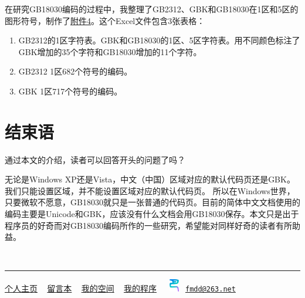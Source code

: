 \documentclass[cn,hazy,blue,14pt,screen]{elegantnote}
\begin{document}
在研究GB18030编码的过程中，我整理了GB2312、GBK和GB18030在1区和5区的图形符号，制作了\href{samples/sym.zip}{附件4}。这个Excel文件包含3张表格：

\begin{enumerate}

\item
  GB2312的1区字符表。GBK和GB18030的1区、5区字符表。用不同颜色标注了GBK增加的35个字符和GB18030增加的11个字符。
\item
  GB2312 1区682个符号的编码。
\item
  GBK 1区717个符号的编码。
\end{enumerate}

\hypertarget{ux7ed3ux675fux8bed}{%
\section{结束语}\label{ux7ed3ux675fux8bed}}

通过本文的介绍，读者可以回答开头的问题了吗？

无论是Windows
XP还是Vista，中文（中国）区域对应的默认代码页还是GBK。我们只能设置区域，并不能设置区域对应的默认代码页。
所以在Windows世界，只要微软不愿意，GB18030就只是一张普通的代码页。目前的简体中文文档使用的编码主要是Unicode和GBK，应该没有什么文档会用GB18030保存。本文只是出于程序员的好奇而对GB18030编码所作的一些研究，希望能对同样好奇的读者有所助益。

~


\begin{center}\rule{0.5\linewidth}{0.5pt}\end{center}

\href{index.html}{个人主页} \textbar~
\href{http://post.baidu.com/f?kw=fmddlmyy}{留言本} \textbar~
\href{http://hi.baidu.com/fmddlmyy}{我的空间} \textbar~
\href{myprog.html}{我的程序} \textbar~
\includegraphics[width=0.29167in,height=0.21875in]{logo.png}
\href{mailto:fmdd@263.net}{\nolinkurl{fmdd@263.net}}
\end{document}
